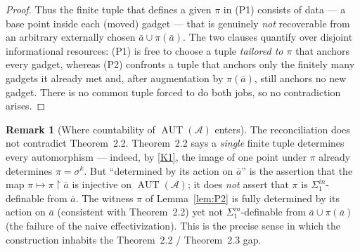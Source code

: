 \documentclass[12pt,fullpage]{article}
\theoremstyle{definition}
\newtheorem{remark}[theorem]{Remark}
\newcommand{\A}{\mathcal{A}}
\newcommand{\AUT}{\operatorname{AUT}}
\begin{document}
\begin{proof}
Thus the finite tuple that defines a given $\pi$ in (P1) consists of data --- a
base point inside each (moved) gadget --- that is genuinely \emph{not}
recoverable from an arbitrary externally chosen $\bar a\cup\pi(\bar a)$.  The
two clauses quantify over disjoint informational resources: (P1) is free to
choose a tuple \emph{tailored to $\pi$} that anchors every gadget, whereas
(P2) confronts a tuple that anchors only the finitely many gadgets it already
met and, after augmentation by $\pi(\bar a)$, still anchors no new gadget.
There is no common tuple forced to do both jobs, so no contradiction arises.
\end{proof}

\begin{remark}[Where countability of $\AUT(\A)$ enters]
The reconciliation does not contradict Theorem~2.2.  Theorem~2.2 says a
\emph{single} finite tuple determines every automorphism --- indeed, by
\ref{K1}, the image of one point under $\pi$ already determines
$\pi=\sigma^k$.  But ``determined by its action on $\bar a$'' is the assertion
that the map $\pi\mapsto\pi\restriction\bar a$ is injective on $\AUT(\A)$; it
does \emph{not} assert that $\pi$ is $\Sigma^{in}_1$-definable from $\bar a$.
The witness $\pi$ of Lemma~\ref{lem:P2} is fully determined by its action on
$\bar a$ (consistent with Theorem~2.2) yet not $\Sigma^{in}_1$-definable from
$\bar a\cup\pi(\bar a)$ (the failure of the naive effectivization).  This is
the precise sense in which the construction inhabits the Theorem~2.2 /
Theorem~2.3 gap.
\end{remark}
\end{document}
